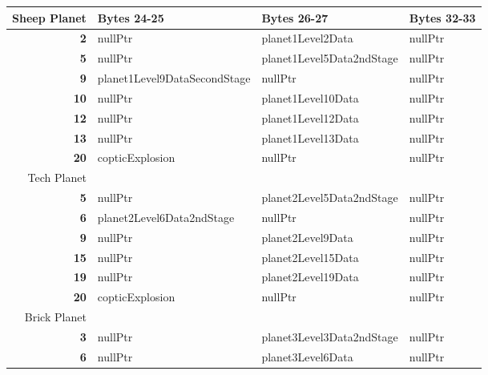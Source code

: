 \begin{figure}[H]
  {
  \setlength{\tabcolsep}{3.0pt}
  \setlength\cmidrulewidth{\heavyrulewidth} %
  \begin{adjustbox}{width=\textwidth}

\begin{tabular}{rlll}
\toprule
   Sheep Planet & Bytes 24-25                      & Bytes 26-27                   & Bytes 32-33   \\
\midrule
       \textbf{2} & nullPtr                      & planet1Level2Data         & nullPtr       \\
       \textbf{5} & nullPtr                      & planet1Level5Data2ndStage & nullPtr       \\
       \textbf{9} & planet1Level9DataSecondStage & nullPtr                   & nullPtr       \\
      \textbf{10} & nullPtr                      & planet1Level10Data        & nullPtr       \\
      \textbf{12} & nullPtr                      & planet1Level12Data        & nullPtr       \\
      \textbf{13} & nullPtr                      & planet1Level13Data        & nullPtr       \\
      \textbf{20} & copticExplosion              & nullPtr                   & nullPtr       \\
\toprule
   Tech Planet \\
\midrule
       \textbf{5} & nullPtr                   & planet2Level5Data2ndStage & nullPtr       \\
       \textbf{6} & planet2Level6Data2ndStage & nullPtr                   & nullPtr       \\
       \textbf{9} & nullPtr                   & planet2Level9Data         & nullPtr       \\
      \textbf{15} & nullPtr                   & planet2Level15Data        & nullPtr       \\
      \textbf{19} & nullPtr                   & planet2Level19Data        & nullPtr       \\
      \textbf{20} & copticExplosion           & nullPtr                   & nullPtr       \\
\toprule
  Brick Planet\\
\midrule
       \textbf{3} & nullPtr                   & planet3Level3Data2ndStage & nullPtr       \\
       \textbf{6} & nullPtr                   & planet3Level6Data         & nullPtr       \\

\end{tabular}
\end{adjustbox}}
\end{figure}
